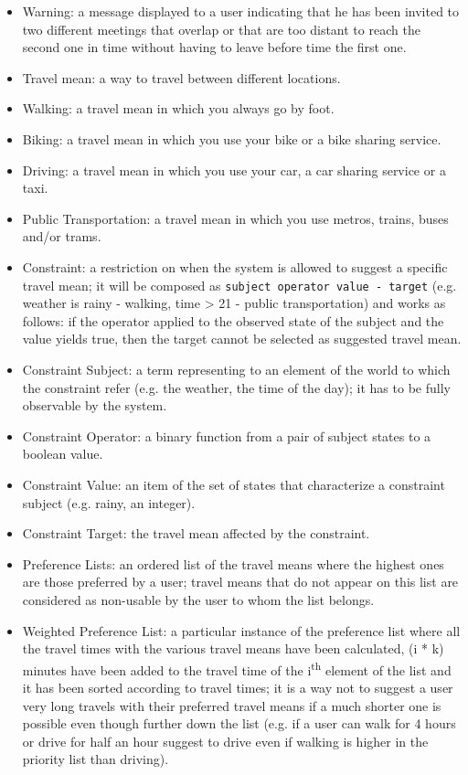 \begin{itemize}
\item Warning: a message displayed to a user indicating that he has been invited to two different meetings that overlap or that are too distant to reach the second one in time without having to leave before time the first one.

\item Travel mean: a way to travel between different locations.
\item Walking: a travel mean in which you always go by foot.
\item Biking: a travel mean in which you use your bike or a bike sharing service.
\item Driving: a travel mean in which you use your car, a car sharing service or a taxi.
\item Public Transportation: a travel mean in which you use metros, trains, buses and/or trams.

\item Constraint: a restriction on when the system is allowed to suggest a specific travel mean; it will be composed as \texttt{subject operator value - target} (e.g. weather is rainy - walking, time > 21 - public transportation) and works as follows: if the operator applied to the observed state of the subject and the value yields true, then the target cannot be selected as suggested travel mean.
\item Constraint Subject: a term representing to an element of the world to which the constraint refer (e.g. the weather, the time of the day); it has to be fully observable by the system.
\item Constraint Operator: a binary function from a pair of subject states to a boolean value.
\item Constraint Value: an item of the set of states that characterize a constraint subject (e.g. rainy, an integer).
\item Constraint Target: the travel mean affected by the constraint.

\item Preference Lists: an ordered list of the travel means where the highest ones are those preferred by a user; travel means that do not appear on this list are considered as non-usable by the user to whom the list belongs.
\item Weighted Preference List: a particular instance of the preference list where all the travel times with the various travel means have been calculated, (i * k) minutes have been added to the travel time of the i\textsuperscript{th} element of the list and it has been sorted according to travel times; it is a way not to suggest a user very long travels with their preferred travel means if a much shorter one is possible even though further down the list (e.g. if a user can walk for 4 hours or drive for half an hour suggest to drive even if walking is higher in the priority list than driving).
\end{itemize}